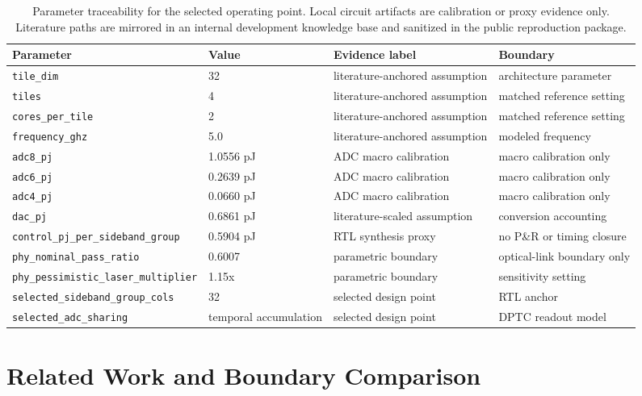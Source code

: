 \documentclass[10pt,journal]{IEEEtran}
\begin{document}
\begin{table}[t]
\centering
\caption{Parameter traceability for the selected operating point. Local circuit
artifacts are calibration or proxy evidence only. Literature paths are mirrored
in an internal development knowledge base and sanitized in the public
reproduction package.}
\label{tab:calibration}
\footnotesize
\begin{tabular}{llll}
\toprule
Parameter & Value & Evidence label & Boundary \\
\midrule
\texttt{tile\_dim} & 32 & literature-anchored assumption & architecture parameter \\
\texttt{tiles} & 4 & literature-anchored assumption & matched reference setting \\
\texttt{cores\_per\_tile} & 2 & literature-anchored assumption & matched reference setting \\
\texttt{frequency\_ghz} & 5.0 & literature-anchored assumption & modeled frequency \\
\texttt{adc8\_pj} & 1.0556 pJ & ADC macro calibration & macro calibration only \\
\texttt{adc6\_pj} & 0.2639 pJ & ADC macro calibration & macro calibration only \\
\texttt{adc4\_pj} & 0.0660 pJ & ADC macro calibration & macro calibration only \\
\texttt{dac\_pj} & 0.6861 pJ & literature-scaled assumption & conversion accounting \\
\texttt{control\_pj\_per\_sideband\_group} & 0.5904 pJ & RTL synthesis proxy & no P\&R or timing closure \\
\texttt{phy\_nominal\_pass\_ratio} & 0.6007 & parametric boundary & optical-link boundary only \\
\texttt{phy\_pessimistic\_laser\_multiplier} & 1.15x & parametric boundary & sensitivity setting \\
\texttt{selected\_sideband\_group\_cols} & 32 & selected design point & RTL anchor \\
\texttt{selected\_adc\_sharing} & temporal accumulation & selected design point & DPTC readout model \\
\bottomrule
\end{tabular}
\end{table}

\section{Related Work and Boundary Comparison}
\end{document}
